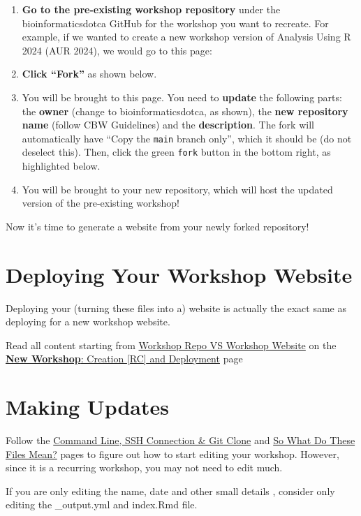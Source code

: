 \documentclass[
]{book}
\theoremstyle{definition}
\theoremstyle{definition}
\theoremstyle{definition}
\theoremstyle{definition}
\theoremstyle{remark}
\begin{document}
\begin{enumerate}
\def\labelenumi{\arabic{enumi}.}
\item
  \textbf{Go to the pre-existing workshop repository} under the bioinformaticsdotca GitHub for the workshop you want to recreate. For example, if we wanted to create a new workshop version of Analysis Using R 2024 (AUR 2024), we would go to this page:
\item
  \textbf{Click ``Fork''} as shown below.
\item
  You will be brought to this page. You need to \textbf{update} the following parts: the \textbf{owner} (change to bioinformaticsdotca, as shown), the \textbf{new repository name} (follow CBW Guidelines) and the \textbf{description}. The fork will automatically have ``Copy the \texttt{main} branch only'', which it should be (do not deselect this). Then, click the green \texttt{fork} button in the bottom right, as highlighted below.
\item
  You will be brought to your new repository, which will host the updated version of the pre-existing workshop!
\end{enumerate}

Now it's time to generate a website from your newly forked repository!

\section{Deploying Your Workshop Website}\label{deploying-your-workshop-website}

Deploying your (turning these files into a) website is actually the exact same as deploying for a new workshop website.

Read all content starting from \hyperref[workshop-vs-repo]{Workshop Repo VS Workshop Website} on the \hyperref[new-workshop-create-deploy]{\textbf{New Workshop}: Creation {[}RC{]} and Deployment} page

\section{Making Updates}\label{making-updates}

Follow the \hyperref[git-instruct]{Command Line, SSH Connection \& Git Clone} and \hyperref[file-explanation]{So What Do These Files Mean?} pages to figure out how to start editing your workshop. However, since it is a recurring workshop, you may not need to edit much.

If you are only editing the name, date and other small details , consider only editing the \_output.yml and index.Rmd file.
\end{document}
